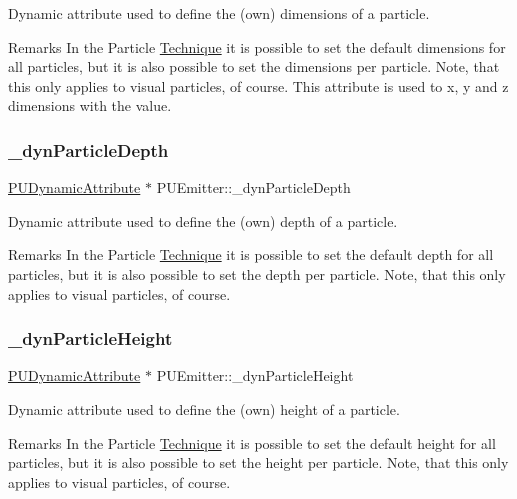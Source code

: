 Dynamic attribute used to define the (own) dimensions of a particle. \begin{DoxyRemark}{Remarks}
In the Particle \hyperlink{classTechnique}{Technique} it is possible to set the default dimensions for all particles, but it is also possible to set the dimensions per particle. Note, that this only applies to visual particles, of course. This attribute is used to x, y and z dimensions with the value. 
\end{DoxyRemark}
\mbox{\label{classPUEmitter_a4bdaecbbf84d8f7bbf1d84bfe2d0a47d}} 
\subsubsection{\texorpdfstring{\+\_\+dyn\+Particle\+Depth}{\_dynParticleDepth}}
{\footnotesize\ttfamily \hyperlink{classPUDynamicAttribute}{P\+U\+Dynamic\+Attribute} $\ast$ P\+U\+Emitter\+::\+\_\+dyn\+Particle\+Depth\hspace{0.3cm}{\ttfamily [protected]}}

Dynamic attribute used to define the (own) depth of a particle. \begin{DoxyRemark}{Remarks}
In the Particle \hyperlink{classTechnique}{Technique} it is possible to set the default depth for all particles, but it is also possible to set the depth per particle. Note, that this only applies to visual particles, of course. 
\end{DoxyRemark}
\mbox{\label{classPUEmitter_adbb061ee652191ccc7e15495dd32ddd6}} 
\subsubsection{\texorpdfstring{\+\_\+dyn\+Particle\+Height}{\_dynParticleHeight}}
{\footnotesize\ttfamily \hyperlink{classPUDynamicAttribute}{P\+U\+Dynamic\+Attribute} $\ast$ P\+U\+Emitter\+::\+\_\+dyn\+Particle\+Height\hspace{0.3cm}{\ttfamily [protected]}}

Dynamic attribute used to define the (own) height of a particle. \begin{DoxyRemark}{Remarks}
In the Particle \hyperlink{classTechnique}{Technique} it is possible to set the default height for all particles, but it is also possible to set the height per particle. Note, that this only applies to visual particles, of course. 
\end{DoxyRemark}
\mbox{\label{classPUEmitter_a7de6c52d69bf9230b85ba825f6747944}} 
